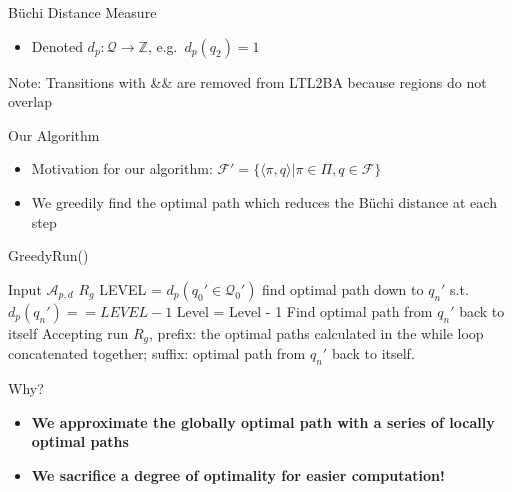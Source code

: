 \documentclass{beamer}
\newcommand{\Q}{\mathcal{Q}}
\newcommand{\A}{\mathcal{A}}
\begin{document}
\begin{frame}{B\"uchi Distance Measure}
\begin{figure}
\end{figure}
  \begin{itemize}
  \item {
    Denoted $d_p:\Q \rightarrow \mathbb{Z}$, e.g.\ $d_p(q_2) = 1$ 
    }
  \end{itemize}
\small Note: Transitions with \&\& are removed from LTL2BA because regions do not overlap

\end{frame}




\begin{frame}{Our Algorithm}
\begin{itemize}
\item {
	Motivation for our algorithm: $\mathcal{F}' = \{ \langle \pi, q \rangle | \pi \in \Pi, q \in \mathcal{F}\}$  
}
\item { 
	We greedily find the optimal path which reduces the B\"uchi distance at each step
	}
\end{itemize}
\begin{algorithm}[H]
\caption{GreedyRun()}
\begin{algorithmic}[1]
\Require Input $\A_{p,d}$
\Ensure $R_{g}$
\State LEVEL = $d_p(q_0' \in \Q_0')$
\State find optimal path down to $q_n'$ s.t. $d_p(q_n')==LEVEL-1$
\State Level = Level - 1	
\EndWhile
\State Find optimal path from $q_n'$ back to itself
\State Accepting run $R_{g}$, prefix: the optimal paths calculated in the while loop concatenated together; suffix: optimal path from $q_n'$ back to itself.
\end{algorithmic}
\end{algorithm}

\end{frame}

\begin{frame}{Why?}
\begin{itemize}
\item {
	\Large \textbf{We approximate the globally optimal path with a series of locally optimal paths}
}
\item {
	\Large \textbf{We sacrifice a degree of optimality for easier computation!}
}
\end{itemize}
\end{frame}
\end{document}
